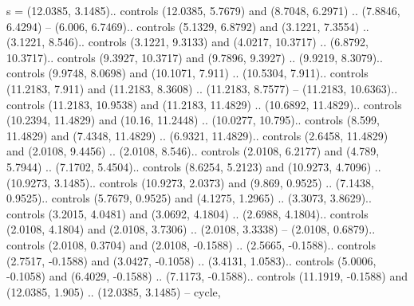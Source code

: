 s = {(12.0385, 3.1485).. controls (12.0385, 5.7679) and (8.7048, 6.2971) .. (7.8846, 6.4294) -- (6.006, 6.7469).. controls (5.1329, 6.8792) and (3.1221, 7.3554) .. (3.1221, 8.546).. controls (3.1221, 9.3133) and (4.0217, 10.3717) .. (6.8792, 10.3717).. controls (9.3927, 10.3717) and (9.7896, 9.3927) .. (9.9219, 8.3079).. controls (9.9748, 8.0698) and (10.1071, 7.911) .. (10.5304, 7.911).. controls (11.2183, 7.911) and (11.2183, 8.3608) .. (11.2183, 8.7577) -- (11.2183, 10.6363).. controls (11.2183, 10.9538) and (11.2183, 11.4829) .. (10.6892, 11.4829).. controls (10.2394, 11.4829) and (10.16, 11.2448) .. (10.0277, 10.795).. controls (8.599, 11.4829) and (7.4348, 11.4829) .. (6.9321, 11.4829).. controls (2.6458, 11.4829) and (2.0108, 9.4456) .. (2.0108, 8.546).. controls (2.0108, 6.2177) and (4.789, 5.7944) .. (7.1702, 5.4504).. controls (8.6254, 5.2123) and (10.9273, 4.7096) .. (10.9273, 3.1485).. controls (10.9273, 2.0373) and (9.869, 0.9525) .. (7.1438, 0.9525).. controls (5.7679, 0.9525) and (4.1275, 1.2965) .. (3.3073, 3.8629).. controls (3.2015, 4.0481) and (3.0692, 4.1804) .. (2.6988, 4.1804).. controls (2.0108, 4.1804) and (2.0108, 3.7306) .. (2.0108, 3.3338) -- (2.0108, 0.6879).. controls (2.0108, 0.3704) and (2.0108, -0.1588) .. (2.5665, -0.1588).. controls (2.7517, -0.1588) and (3.0427, -0.1058) .. (3.4131, 1.0583).. controls (5.0006, -0.1058) and (6.4029, -0.1588) .. (7.1173, -0.1588).. controls (11.1919, -0.1588) and (12.0385, 1.905) .. (12.0385, 3.1485) -- cycle},
